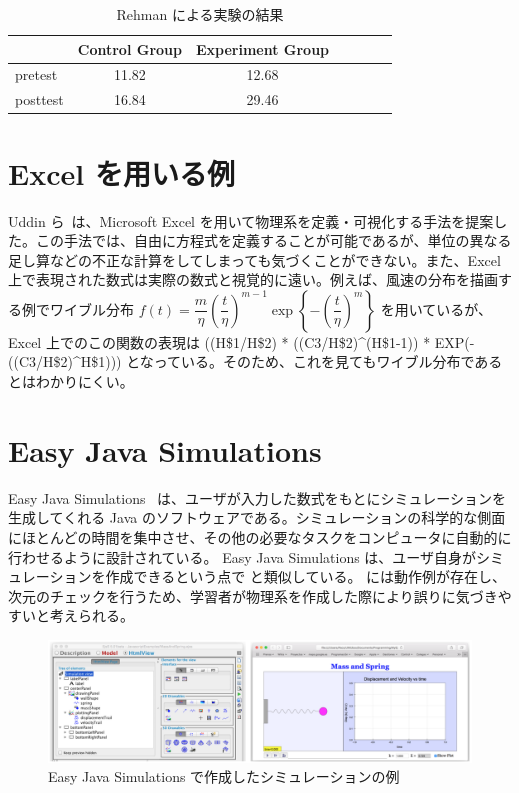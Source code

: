 \begin{table}[htb]
\centering
\begin{tabular}{lcccccc}
\toprule
& Control Group & Experiment Group \\
\midrule
pretest & 11.82 & 12.68 \\
posttest & 16.84 & 29.46 \\
\bottomrule
\end{tabular}
\caption{Rehman による実験の結果} \label{rehman_result}
\end{table}


\section{Excel を用いる例}

Uddin ら~\cite{uddin_teaching_2017}は、Microsoft Excel を用いて物理系を定義・可視化する手法を提案した。この手法では、自由に方程式を定義することが可能であるが、単位の異なる足し算などの不正な計算をしてしまっても気づくことができない。また、Excel 上で表現された数式は実際の数式と視覚的に遠い。例えば、風速の分布を描画する例でワイブル分布 $f(t) = \dfrac{m}{\eta}\left(\dfrac{t}{\eta}\right)^{m-1}\exp{\left\{-\left(\dfrac{t}{\eta}\right)^m\right\}}$ を用いているが、Excel 上でのこの関数の表現は ((H\$1/H\$2) * ((C3/H\$2)\^{}(H\$1-1)) * EXP(-((C3/H\$2)\^{}H\$1))) となっている。そのため、これを見てもワイブル分布であるとはわかりにくい。

\section{Easy Java Simulations}
Easy Java Simulations~\cite{christian_modeling_2007} は、ユーザが入力した数式をもとにシミュレーションを生成してくれる Java のソフトウェアである。シミュレーションの科学的な側面にほとんどの時間を集中させ、その他の必要なタスクをコンピュータに自動的に行わせるように設計されている。
Easy Java Simulations は、ユーザ自身がシミュレーションを作成できるという点で \simname と類似している。 \simname には動作例が存在し、次元のチェックを行うため、学習者が物理系を作成した際により誤りに気づきやすいと考えられる。

\begin{figure}[htb]
  \centering
  \includegraphics[width=0.9\linewidth]{work/ejs_example.png}
  \caption{Easy Java Simulations で作成したシミュレーションの例~\cite{esquembre_easy_2019}}
\end{figure}
